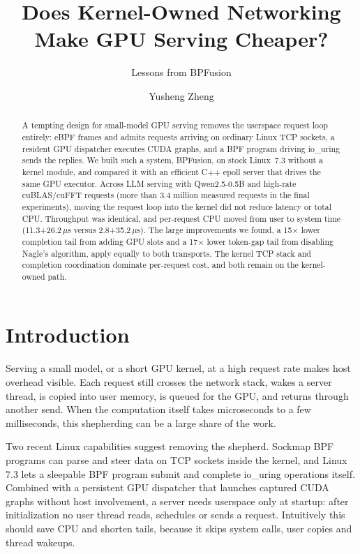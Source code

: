 \documentclass[sigconf,nonacm]{acmart}
\newcommand{\us}{\,$\mu$s}
\begin{document}
\title{Does Kernel-Owned Networking Make GPU Serving Cheaper?}
\subtitle{Lessons from BPFusion}

\author{Yusheng Zheng}

\begin{abstract}
A tempting design for small-model GPU serving removes the userspace request
loop entirely: eBPF frames and admits requests arriving on ordinary Linux TCP
sockets, a resident GPU dispatcher executes CUDA graphs, and a BPF program
driving io\_uring sends the replies. We built such a system, BPFusion, on stock
Linux~7.3 without a kernel module, and compared it with an efficient C++ epoll
server that drives the same GPU executor. Across LLM serving with
Qwen2.5-0.5B and high-rate cuBLAS/cuFFT requests (more than 3.4 million
measured requests in the final experiments), moving the request loop into the
kernel did not reduce latency or total CPU. Throughput was identical, and
per-request CPU moved from user to system time (11.3+26.2\us{} versus
2.8+35.2\us). The large improvements we found, a 15$\times$ lower completion
tail from adding GPU slots and a 17$\times$ lower token-gap tail from disabling
Nagle's algorithm, apply equally to both transports. The kernel TCP stack and
completion coordination dominate per-request cost, and both remain on the
kernel-owned path.
\end{abstract}

\maketitle

\section{Introduction}

Serving a small model, or a short GPU kernel, at a high request rate makes host
overhead visible. Each request still crosses the network stack, wakes a server
thread, is copied into user memory, is queued for the GPU, and returns through
another send. When the computation itself takes microseconds to a few
milliseconds, this shepherding can be a large share of the work.

Two recent Linux capabilities suggest removing the shepherd. Sockmap BPF
programs can parse and steer data on TCP sockets inside the kernel, and Linux
7.3 lets a sleepable BPF program submit and complete io\_uring operations
itself. Combined with a persistent GPU dispatcher that launches captured CUDA
graphs without host involvement, a server needs userspace only at startup:
after initialization no user thread reads, schedules or sends a request.
Intuitively this should save CPU and shorten tails, because it skips system
calls, user copies and thread wakeups.
\end{document}
